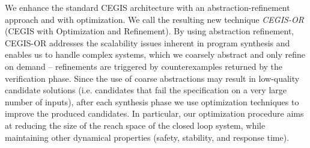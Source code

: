 \documentclass[sigconf]{llncs}
\begin{document}
We enhance the standard CEGIS architecture with an abstraction-refinement
approach and with optimization.  We call the resulting new technique
\emph{CEGIS-OR} (CEGIS with Optimization and Refinement).  By using
abstraction refinement, CEGIS-OR addresses the scalability issues inherent
in program synthesis and enables us to handle complex systems, which we
coarsely abstract and only refine on demand -- refinements are triggered by
counterexamples returned by the verification phase.
%
%
Since the use of coarse abstractions may result in low-quality candidate
solutions (i.e.  candidates that fail the specification on a very large
number of inputs), after each synthesis phase we use optimization techniques
to improve the produced candidates.  In particular, our optimization
procedure aims at reducing the size of the reach space of the closed loop
system, while maintaining other dynamical properties (safety, stability, and
response time).

\end{document}
